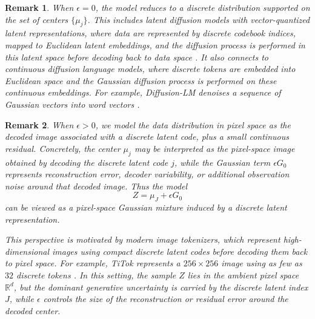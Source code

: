 \documentclass[11pt]{article}
\def\times{×}%
\newtheorem{remark}{Remark}
\newcommand{\R}{\mathbb{R}}
\newcommand{\eps}{\epsilon}
\begin{document}
\begin{remark}
When $\eps=0$, the model reduces to a discrete distribution supported on the
set of centers $\{\mu_j\}$. This includes latent diffusion models with
vector-quantized latent representations, where data are represented by
discrete codebook indices, mapped to Euclidean latent embeddings, and the
diffusion process is performed in this latent space before decoding back to
data space \cite{rombach2022high}. It also connects to continuous diffusion
language models, where discrete tokens are embedded into Euclidean space and
the Gaussian diffusion process is performed on these continuous embeddings.
For example, Diffusion-LM denoises a sequence of Gaussian vectors into word
vectors \cite{li2022diffusion}.
\end{remark}
\begin{remark}
When $\eps>0$, we model the data distribution in pixel space as the decoded
image associated with a discrete latent code, plus a small continuous residual.
Concretely, the center $\mu_j$ may be interpreted as the pixel-space image
obtained by decoding the discrete latent code $j$, while the Gaussian term
$\eps G_0$ represents reconstruction error, decoder variability, or additional
observation noise around that decoded image. Thus the model
\[
    Z=\mu_J+\eps G_0
\]
can be viewed as a pixel-space Gaussian mixture induced by a discrete latent
representation.

This perspective is motivated by modern image tokenizers, which represent
high-dimensional images using compact discrete latent codes before decoding
them back to pixel space. For example, TiTok represents a $256\times256$ image
using as few as $32$ discrete tokens \cite{yu2024image}. In this setting, the
sample $Z$ lies in the ambient pixel space $\R^d$, but the dominant generative
uncertainty is carried by the discrete latent index $J$, while $\eps$ controls
the size of the reconstruction or residual error around the decoded center.
\end{remark}
\end{document}
